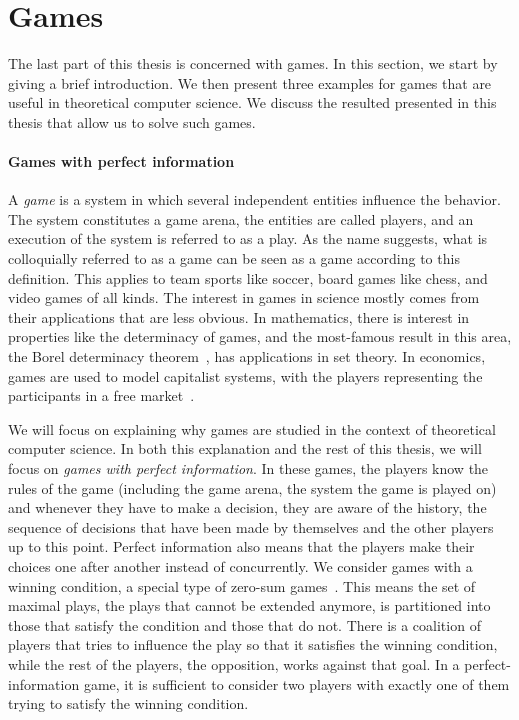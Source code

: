 \documentclass[../../diss.tex]{subfiles}
\begin{document}
\section{Games}%
\label{Section:IntroGames}%

The last part of this thesis is concerned with games.
In this section, we start by giving a brief introduction.
We then present three examples for games that are useful in theoretical computer science.
We discuss the resulted presented in this thesis that allow us to solve such games.

\paragraph{Games with perfect information}

A \emph{game} is a system in which several independent entities influence the behavior.
The system constitutes a game arena, the entities are called players, and an execution of the system is referred to as a play.
As the name suggests, what is colloquially referred to as a game can be seen as a game according to this definition.
This applies to team sports like soccer, board games like chess, and video games of all kinds.
The interest in games in science mostly comes from their applications that are less obvious.
In mathematics, there is interest in properties like the determinacy of games, and the most-famous result in this area, the Borel determinacy theorem~\cite{Martin75}, has applications in set theory.
In economics, games are used to model capitalist systems, with the players representing the participants in a free market~\cite{LaCasseR94}.

We will focus on explaining why games are studied in the context of theoretical computer science.
In both this explanation and the rest of this thesis, we will focus on \emph{games with perfect information}.
In these games, the players know the rules of the game (including the game arena, \ie the system the game is played on) and whenever they have to make a decision, they are aware of the history, the sequence of decisions that have been made by themselves and the other players up to this point.
Perfect information also means that the players make their choices one after another instead of concurrently.
We consider games with a winning condition, a special type of zero-sum games~\cite{Raghavan94}.
This means the set of maximal plays, the plays that cannot be extended anymore, is partitioned into those that satisfy the condition and those that do not.
There is a coalition of players that tries to influence the play so that it satisfies the winning condition, while the rest of the players, the opposition, works against that goal.
In a perfect-information game, it is sufficient to consider two players with exactly one of them trying to satisfy the winning condition.
\end{document}
